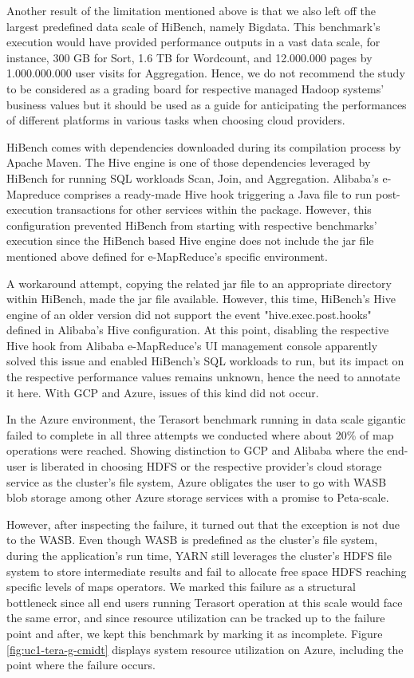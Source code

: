\documentclass[review]{elsarticle}
\begin{document}
Another result of the limitation mentioned above is that we also left off the largest predefined data scale of HiBench, namely Bigdata. This benchmark's execution would have provided performance outputs in a vast data scale, for instance, 300 GB for Sort, 1.6 TB for Wordcount, and 12.000.000 pages by 1.000.000.000 user visits for Aggregation. Hence, we do not recommend the study to be considered as a grading board for respective managed Hadoop systems' business values but it should be used as a guide for anticipating the performances of different platforms in various tasks when choosing cloud providers.

HiBench comes with dependencies downloaded during its compilation process by Apache Maven. The Hive engine is one of those dependencies leveraged by HiBench for running SQL workloads Scan, Join, and Aggregation. Alibaba's e-Mapreduce comprises a ready-made Hive hook triggering a Java file to run post-execution transactions for other services within the package. However, this configuration prevented HiBench from starting with respective benchmarks' execution since the HiBench based Hive engine does not include the jar file mentioned above defined for e-MapReduce's specific environment. 

A workaround attempt, copying the related jar file to an appropriate directory within HiBench, made the jar file available. However, this time, HiBench's Hive engine of an older version did not support the event     "hive.exec.post.hooks" defined in Alibaba's Hive configuration. At this point, disabling the respective Hive hook from Alibaba e-MapReduce's UI management console apparently solved this issue and enabled HiBench's SQL workloads to run, but its impact on the respective performance values remains unknown, hence the need to annotate it here. With GCP and Azure, issues of this kind did not occur.

In the Azure environment, the Terasort benchmark running in data scale gigantic failed to complete in all three attempts we conducted where about 20\% of map operations were reached. Showing distinction to GCP and Alibaba where the end-user is liberated in choosing HDFS or the respective provider's cloud storage service as the cluster's file system, Azure obligates the user to go with WASB blob storage among other Azure storage services with a promise to Peta-scale. 

However, after inspecting the failure, it turned out that the exception is not due to the WASB. Even though WASB is predefined as the cluster's file system, during the application's run time, YARN still leverages the cluster's HDFS file system to store intermediate results and fail to allocate free space HDFS reaching specific levels of maps operators. We marked this failure as a structural bottleneck since all end users running Terasort operation at this scale would face the same error, and since resource utilization can be tracked up to the failure point and after, we kept this benchmark by marking it as incomplete. Figure \ref{fig:uc1-tera-g-cmidt} displays system resource utilization on Azure, including the point where the failure occurs.
\end{document}
